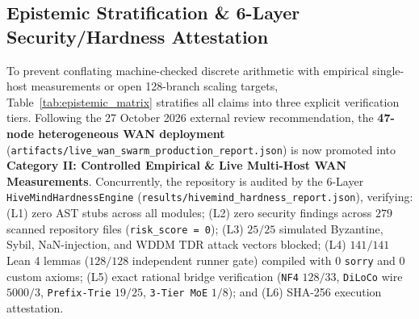 \documentclass[11pt,a4paper]{article}
\begin{document}
\subsection{Epistemic Stratification \& 6-Layer Security/Hardness Attestation}

To prevent conflating machine-checked discrete arithmetic with empirical single-host measurements or open 128-branch scaling targets, Table~\ref{tab:epistemic_matrix} stratifies all claims into three explicit verification tiers. Following the 27 October 2026 external review recommendation, the \textbf{47-node heterogeneous WAN deployment} (\texttt{artifacts/live\_wan\_swarm\_production\_report.json}) is now promoted into \textbf{Category II: Controlled Empirical \& Live Multi-Host WAN Measurements}. Concurrently, the repository is audited by the 6-Layer \texttt{HiveMindHardnessEngine} (\texttt{results/hivemind\_hardness\_report.json}), verifying: (L1) zero AST stubs across all modules; (L2) zero security findings across $279$ scanned repository files (\texttt{risk\_score = 0}); (L3) $25/25$ simulated Byzantine, Sybil, NaN-injection, and WDDM TDR attack vectors blocked; (L4) $141/141$ Lean 4 lemmas ($128/128$ independent runner gate) compiled with $0$ \texttt{sorry} and $0$ custom axioms; (L5) exact rational bridge verification (\texttt{NF4} $128/33$, \texttt{DiLoCo} wire $5000/3$, \texttt{Prefix-Trie} $19/25$, \texttt{3-Tier MoE} $1/8$); and (L6) SHA-256 execution attestation.
\end{document}
